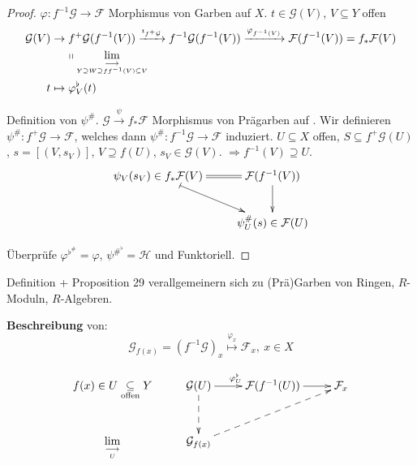 \begin{proof}
  $\varphi:f^{-1}\mathcal{G}\rightarrow\mathcal{F}$ Morphismus von
  Garben auf $X$. $t\in\mathcal{G}(V)$, $V\subseteq Y$ offen
  \begin{align*}
    \mathcal{G}(V) & \rightarrow f^{+}\mathcal{G}(f^{-1}(V))\xrightarrow{\imath_{f^{+}\mathcal{G}}}f^{-1}\mathcal{G}(f^{-1}(V))\xrightarrow{\varphi_{f^{-1}(V)}}\mathcal{F}(f^{-1}(V))=f_{\ast}\mathcal{F}(V)\\
    & \phantom{\rightarrow\ }\shortparallel\underset{\underset{Y\supseteq W\supseteq ff^{-1}(V)\subseteq V}{\longrightarrow}}{\lim}\\
    t & \mapsto\varphi_{V}^{\flat}(t)
  \end{align*}

  Definition von $\psi^{\#}$. $\mathcal{G}\xrightarrow{\psi}f_{\ast}\mathcal{F}$
  Morphismus von Prägarben auf . Wir definieren $\psi^{\#}:f^{+}\mathcal{G}\rightarrow\mathcal{F}$,
  welches dann $\psi^{\#}:f^{-1}\mathcal{G}\rightarrow\mathcal{F}$
  induziert. $U\subseteq X$ offen, $S\subseteq f^{+}\mathcal{G}(U)$,
  $s=[(V,s_{V})]$, $V\supseteq f(U)$, $s_{V}\in\mathcal{G}(V)$. $\Longrightarrow f^{-1}(V)\supseteq U$.
  \[
  \xymatrix{\psi_{V}(s_{V})\in f_{\ast}\mathcal{F}(V)\ar@{=}[r]\ar@{|->}[rd] & \mathcal{F}(f^{-1}(V))\ar[d]\\
    & \psi_{U}^{\#}(s)\in\mathcal{F}(U)
  }
  \]

  Überprüfe $\varphi^{\flat^{\#}}=\varphi$, $\psi^{\#^{\flat}}=\mathcal{H}$
  und Funktoriell.
\end{proof}
Definition + Proposition 29 verallgemeinern sich zu (Prä)Garben von
Ringen, $R$-Moduln, $R$-Algebren.

\textbf{Beschreibung} von:
\[
\mathcal{G}_{f(x)}=(f^{-1}\mathcal{G})_{x}\overset{\varphi_{x}}{\longmapsto}\mathcal{F}_{x},\ x\in X
\]

\[
\xymatrix{f(x)\in U\underset{\text{offen}}{\subseteq}Y & \mathcal{G}(U)\ar[r]^{\varphi_{U}^{\flat}}\ar@{-->}[d] & \mathcal{F}(f^{-1}(U))\ar[r] & \mathcal{F}_{x}\\
  \underset{\underset{U}{\longrightarrow}}{\lim} & \mathcal{G}_{f(x)}\ar@{-->}[rru]
}
\]
